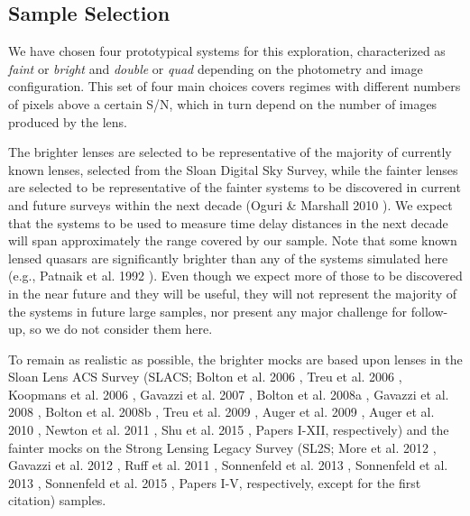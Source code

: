\documentclass[a4paper,11pt]{article}
\begin{document}
\subsection{Sample Selection}

We have chosen four prototypical systems for this exploration,
characterized as {\it faint} or {\it bright} and {\it double} or {\it
quad} depending on the photometry and image configuration. This set of
four main choices covers regimes with different numbers of pixels
above a certain S/N, which in turn depend on the number of images
produced by the lens.


The brighter lenses are selected to be representative of the majority
of currently known lenses, selected from the Sloan Digital Sky Survey,
while the fainter lenses are selected to be representative of the
fainter systems to be discovered in current and future surveys within
the next decade (Oguri \& Marshall 2010
\cite{2010MNRAS.405.2579O}). We expect that the systems to be used to
measure time delay distances in the next decade will span
approximately the range covered by our sample. Note that some known
lensed quasars are significantly brighter than any of the systems
simulated here (e.g., Patnaik et al. 1992 \cite{1992MNRAS.259P...1P}). Even though we
expect more of those to be discovered in the near future and they will
be useful, they will not represent the majority of the systems in
future large samples, nor present any major challenge for follow-up,
so we do not consider them here.

To remain as realistic as possible, the brighter mocks are based upon
lenses in the Sloan Lens ACS Survey (SLACS; Bolton et al. 2006
\cite{2006ApJ...638..703B}, Treu et al. 2006
\cite{2006ApJ...640..662T}, Koopmans et al. 2006
\cite{2006ApJ...649..599K}, Gavazzi et al. 2007
\cite{2007ApJ...667..176G}, Bolton et al. 2008a
\cite{2008ApJ...682..964B}, Gavazzi et al. 2008
\cite{2008ApJ...677.1046G}, Bolton et al. 2008b
\cite{2008ApJ...684..248B}, Treu et al. 2009
\cite{2009ApJ...690..670T}, Auger et al. 2009
\cite{2009ApJ...705.1099A}, Auger et al. 2010
\cite{2010ApJ...724..511A}, Newton et al. 2011
\cite{2011ApJ...734..104N}, Shu et al. 2015
\cite{2014arXiv1407.2240S}, Papers I-XII, respectively) and the fainter mocks on the Strong
Lensing Legacy Survey (SL2S; More et al. 2012
\cite{2012ApJ...749...38M}, Gavazzi et al. 2012 \cite{2012ApJ...761..170G},
Ruff et al. 2011 \cite{2011ApJ...727...96R}, Sonnenfeld et al. 2013
\cite{2013ApJ...777...97S}, Sonnenfeld et al. 2013
\cite{2013ApJ...777...98S}, Sonnenfeld et al. 2015
\cite{2015ApJ...800...94S}, Papers I-V, respectively, except for the
first citation) samples.
\end{document}
